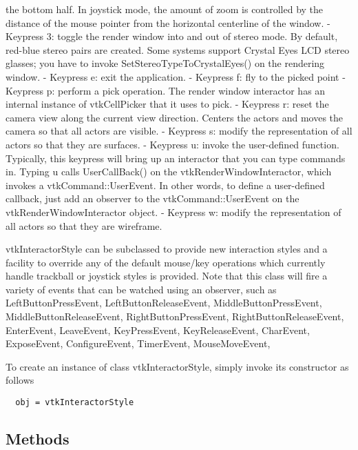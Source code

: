 the bottom half. In joystick mode, the amount of zoom is controlled by the
 distance of the mouse pointer from the horizontal centerline of the
 window.
 - Keypress 3: toggle the render window into and out of stereo mode. By
 default, red-blue stereo pairs are created. Some systems support Crystal
 Eyes LCD stereo glasses; you have to invoke SetStereoTypeToCrystalEyes()
 on the rendering window.
 - Keypress e: exit the application.
 - Keypress f: fly to the picked point
 - Keypress p: perform a pick operation. The render window interactor has
 an internal instance of vtkCellPicker that it uses to pick. 
 - Keypress r: reset the camera view along the current view
 direction. Centers the actors and moves the camera so that all actors are
 visible.
 - Keypress s: modify the representation of all actors so that they are
 surfaces.  
 - Keypress u: invoke the user-defined function. Typically,
 this keypress will bring up an interactor that you can type commands in.
 Typing u calls UserCallBack() on the vtkRenderWindowInteractor, which
 invokes a vtkCommand::UserEvent. In other words, to define a user-defined
 callback, just add an observer to the vtkCommand::UserEvent on the
 vtkRenderWindowInteractor object. 
 - Keypress w: modify the representation of all actors so that they are
 wireframe.

 vtkInteractorStyle can be subclassed to provide new interaction styles and
 a facility to override any of the default mouse/key operations which
 currently handle trackball or joystick styles is provided. Note that this
 class will fire a variety of events that can be watched using an observer,
 such as LeftButtonPressEvent, LeftButtonReleaseEvent,
 MiddleButtonPressEvent, MiddleButtonReleaseEvent, RightButtonPressEvent,
 RightButtonReleaseEvent, EnterEvent, LeaveEvent, KeyPressEvent,
 KeyReleaseEvent, CharEvent, ExposeEvent, ConfigureEvent, TimerEvent,
 MouseMoveEvent,

To create an instance of class vtkInteractorStyle, simply
invoke its constructor as follows
\begin{verbatim}
  obj = vtkInteractorStyle
\end{verbatim}
\subsection{Methods}

